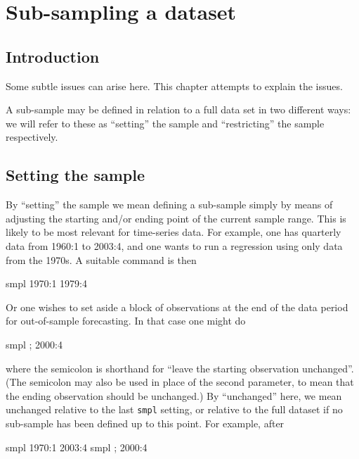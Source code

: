 \chapter{Sub-sampling a dataset}
\label{sampling}

\section{Introduction}
\label{sample-intro}

Some subtle issues can arise here.  This chapter attempts to explain
the issues.

A sub-sample may be defined in relation to a full data set in two
different ways: we will refer to these as ``setting'' the sample and
``restricting'' the sample respectively.

\section{Setting the sample}
\label{sample-set}

By ``setting'' the sample we mean defining a sub-sample simply by
means of adjusting the starting and/or ending point of the current
sample range.  This is likely to be most relevant for time-series
data.  For example, one has quarterly data from 1960:1 to 2003:4, and
one wants to run a regression using only data from the 1970s.  A
suitable command is then

\begin{code}
smpl 1970:1 1979:4
\end{code}

Or one wishes to set aside a block of observations at the end of the
data period for out-of-sample forecasting.  In that case one might do

\begin{code}
smpl ; 2000:4
\end{code}

where the semicolon is shorthand for ``leave the starting observation
unchanged''.  (The semicolon may also be used in place of the second
parameter, to mean that the ending observation should be unchanged.)
By ``unchanged'' here, we mean unchanged relative to the last
\verb+smpl+ setting, or relative to the full dataset if no sub-sample
has been defined up to this point. For example, after

\begin{code}
smpl 1970:1 2003:4
smpl ; 2000:4
\end{code}


